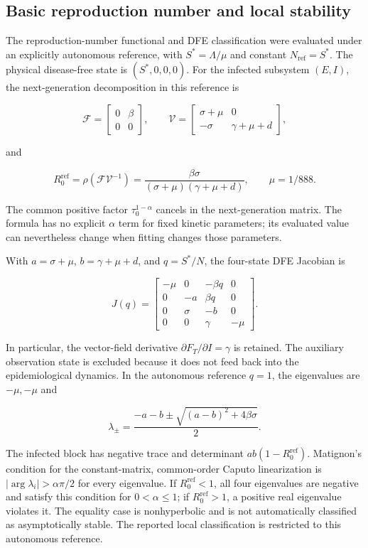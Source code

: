 \documentclass[pdflatex,sn-mathphys-ay,lineno]{sn-jnl}
\begin{document}
\subsection{Basic reproduction number and local stability}

The reproduction-number functional and DFE classification were evaluated under an explicitly autonomous reference, with $S^*=\Lambda/\mu$ and constant $N_{\mathrm{ref}}=S^*$. The physical disease-free state is $(S^*,0,0,0)$. For the infected subsystem $(E,I)$, the next-generation decomposition \citep{vandendriessche2002} in this reference is

\[
\mathcal F=\begin{bmatrix}0&\beta\\0&0\end{bmatrix},\qquad
\mathcal V=\begin{bmatrix}\sigma+\mu&0\\-\sigma&\gamma+\mu+d\end{bmatrix},
\]

and

\[
R_0^{\mathrm{ref}}=\rho(\mathcal F\mathcal V^{-1})=\frac{\beta\sigma}{(\sigma+\mu)(\gamma+\mu+d)},\qquad\mu=1/888.
\]

The common positive factor $\tau_0^{1-\alpha}$ cancels in the next-generation matrix. The formula has no explicit $\alpha$ term for fixed kinetic parameters; its evaluated value can nevertheless change when fitting changes those parameters.

With $a=\sigma+\mu$, $b=\gamma+\mu+d$, and $q=S^*/N$, the four-state DFE Jacobian is

\[
J(q)=\begin{bmatrix}
-\mu&0&-\beta q&0\\
0&-a&\beta q&0\\
0&\sigma&-b&0\\
0&0&\gamma&-\mu
\end{bmatrix}.
\]

In particular, the vector-field derivative $\partial F_T/\partial I=\gamma$ is retained. The auxiliary observation state is excluded because it does not feed back into the epidemiological dynamics. In the autonomous reference $q=1$, the eigenvalues are $-\mu,-\mu$ and

\[
\lambda_{\pm}=\frac{-a-b\pm\sqrt{(a-b)^2+4\beta\sigma}}{2}.
\]

The infected block has negative trace and determinant $ab(1-R_0^{\mathrm{ref}})$. Matignon's condition \citep{matignon1996} for the constant-matrix, common-order Caputo linearization is $|\arg\lambda_i|>\alpha\pi/2$ for every eigenvalue. If $R_0^{\mathrm{ref}}<1$, all four eigenvalues are negative and satisfy this condition for $0<\alpha\le1$; if $R_0^{\mathrm{ref}}>1$, a positive real eigenvalue violates it. The equality case is nonhyperbolic and is not automatically classified as asymptotically stable. The reported local classification is restricted to this autonomous reference.
\end{document}
